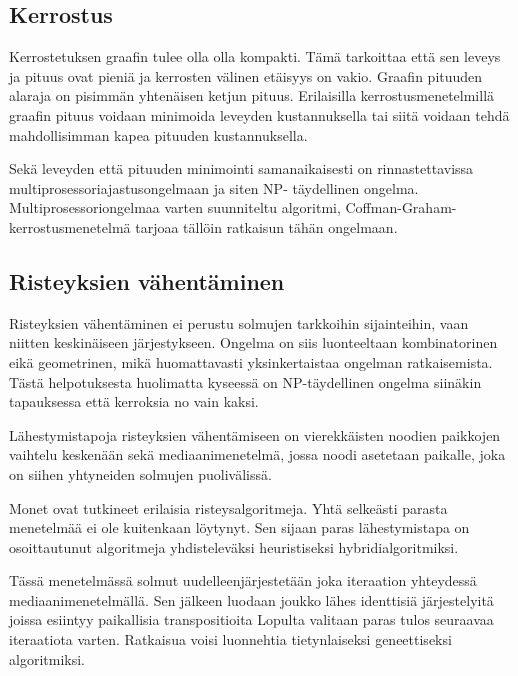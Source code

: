 \documentclass[finnish,12pt]{article}
\begin{document}
		\subsection{Kerrostus}

Kerrostetuksen graafin tulee olla olla kompakti. Tämä tarkoittaa että sen leveys
ja pituus ovat pieniä ja kerrosten välinen etäisyys on vakio. Graafin pituuden
alaraja on pisimmän yhtenäisen ketjun pituus.
Erilaisilla kerrostusmenetelmillä graafin pituus voidaan
minimoida leveyden kustannuksella tai siitä voidaan tehdä mahdollisimman kapea
pituuden kustannuksella.

Sekä leveyden että pituuden minimointi samanaikaisesti on rinnastettavissa
multiprosessoriajastusongelmaan ja siten NP- täydellinen ongelma.
\cite{RefWorks:39} Multiprosessoriongelmaa varten suunniteltu algoritmi,
Coffman-Graham-kerrostusmenetelmä tarjoaa tällöin ratkaisun tähän ongelmaan.

		\subsection{Risteyksien vähentäminen}

Risteyksien vähentäminen ei perustu solmujen tarkkoihin sijainteihin, vaan
niitten keskinäiseen järjestykseen. Ongelma on siis luonteeltaan kombinatorinen
eikä geometrinen, mikä huomattavasti yksinkertaistaa ongelman ratkaisemista.
Tästä helpotuksesta huolimatta kyseessä on NP-täydellinen ongelma siinäkin
tapauksessa että kerroksia no vain kaksi. \cite{RefWorks:40}

Lähestymistapoja risteyksien vähentämiseen on vierekkäisten noodien paikkojen
vaihtelu keskenään sekä mediaanimenetelmä, jossa noodi asetetaan paikalle, joka
on siihen yhtyneiden solmujen puolivälissä.

Monet ovat tutkineet erilaisia risteysalgoritmeja.
Yhtä selkeästi parasta menetelmää ei ole kuitenkaan löytynyt.
Sen sijaan paras lähestymistapa on osoittautunut algoritmeja
yhdisteleväksi heuristiseksi hybridialgoritmiksi.

Tässä menetelmässä solmut uudelleenjärjestetään joka iteraation yhteydessä mediaanimenetelmällä. Sen jälkeen 
luodaan joukko lähes identtisiä järjestelyitä joissa esiintyy paikallisia transpositioita
Lopulta valitaan paras tulos seuraavaa iteraatiota varten.
Ratkaisua voisi luonnehtia tietynlaiseksi geneettiseksi algoritmiksi.
\end{document}
